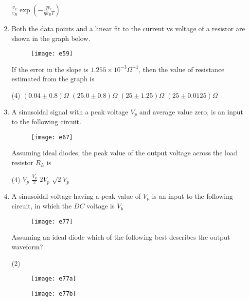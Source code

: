 \begin{enumerate}
\begin{tasks}
		\task[\textbf{D.}]  $\frac{v_{F}}{v_{R}} \exp \left(-\frac{q v_{F}}{\eta k_{B} T}\right)$
	\end{tasks}
	\item Both the data points and a linear fit to the current vs voltage of a resistor are shown in the graph below.\\
	\begin{figure}[H]
		\centering
		\texttt{[image: e59]}
	\end{figure}
	If the error in the slope is $1.255 \times 10^{-3} \Omega^{-1}$, then the value of resistance estimated from the graph is
	{}
	\begin{tasks}(4)
		\task[\textbf{A.}] $(0.04 \pm 0.8) \Omega$
		\task[\textbf{B.}] $(25.0 \pm 0.8) \Omega$
		\task[\textbf{C.}] $(25 \pm 1.25) \Omega$
		\task[\textbf{D.}] $(25 \pm 0.0125) \Omega$
	\end{tasks}
	\item A sinusoidal signal with a peak voltage $V_{p}$ and average value zero, is an input to the following circuit.\\
	\begin{figure}[H]
		\centering
		\texttt{[image: e67]}
	\end{figure}
	Assuming ideal diodes, the peak value of the output voltage across the load resistor $R_{L}$ is
	{}
	\begin{tasks}(4)
		\task[\textbf{A.}] $V_{p}$
		\task[\textbf{B.}] $\frac{V_{p}}{2}$
		\task[\textbf{C.}]  $2 V_{p}$
		\task[\textbf{D.}]  $\sqrt{2} V_{p}$
	\end{tasks}
	\item A sinusoidal voltage having a peak value of $V_ p$ is an input to the following circuit, in which the $DC$ voltage is $V_b$ \\
	\begin{figure}[H]
		\centering
		\texttt{[image: e77]}
	\end{figure}
	Assuming an ideal diode which of the following best describes the output waveform?
	{}
	\begin{tasks}(2)
		\task[\textbf{A.}] \begin{figure}[H]
			\centering
			\texttt{[image: e77a]}
		\end{figure}
		\task[\textbf{B.}] \begin{figure}[H]
			\centering
			\texttt{[image: e77b]}

\end{figure}
\end{tasks}
\end{enumerate}
